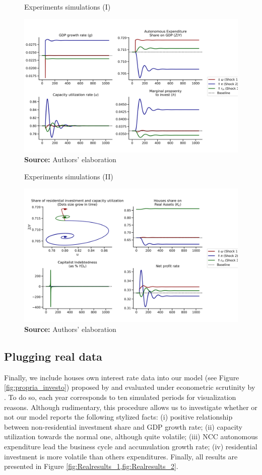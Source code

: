 \documentclass[11pt]{article}
\begin{document}
\begin{figure}[htb]
	\centering
	\caption{Experiments simulations (I)}
	\label{fig:results_1}
	\includegraphics[width=.8\textwidth]{./figs/Compared_Shocks_1.png}
	\caption*{\textbf{Source:} Authors' elaboration}
\end{figure}


\begin{figure}[htb]
	\centering
	\caption{Experiments simulations (II)}
	\label{fig:results_2}
	\includegraphics[width=.8\textwidth]{./figs/Compared_Shocks_2.png}
	\caption*{\textbf{Source:} Authors' elaboration}
\end{figure}


\subsection{Plugging real data}
\label{sec:org6fe26e7}


Finally, we include houses own interest rate data into our model (see Figure \ref{fig:propria_investo}) proposed by \cite{teixeira_crescimento_2015} and evaluated under econometric scrutinity by \textcite{petrini_demanda_2019}.
To do so, each year corresponds to ten simulated periods for visualization reasons.
Although rudimentary, this procedure allows us to investigate whether or not our model reports the following stylized facts:
(i) positive relationship between non-residential investment share and GDP growth rate; (ii) capacity utilization towards the normal one, although quite volatile; (iii) NCC autonomous expenditure lead the business cycle and accumulation growth rate; (iv) residential investment is more volatile than others expenditures.
Finally, all results are presented in Figure \ref{fig:Realresults_1,fig:Realresults_2}.
\end{document}
